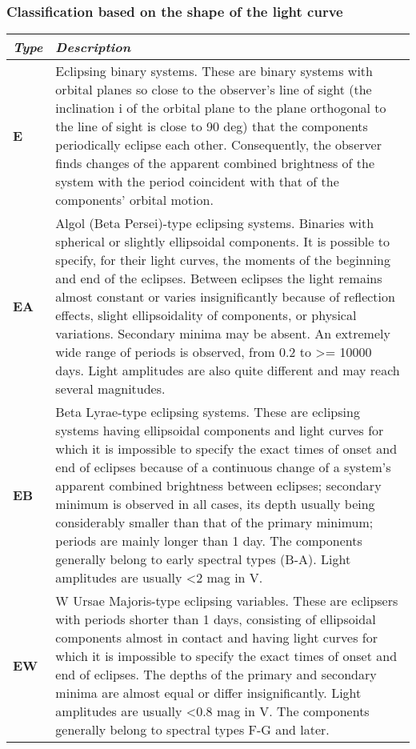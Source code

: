 \subsubsection{Classification based on the shape of the light curve}
\label{classification-based-on-the-shape-of-the-light-curve}

\begin{longtabu} to \textwidth {l|X}\toprule
\emph{Type} & \emph{Description}\\\midrule
\textbf{E}  & Eclipsing binary systems. These are binary systems with
              orbital planes so close to the observer's line of sight (the inclination
              i of the orbital plane to the plane orthogonal to the line of sight is
              close to 90 deg) that the components periodically eclipse each other.
              Consequently, the observer finds changes of the apparent combined
              brightness of the system with the period coincident with that of the
              components' orbital motion.\\\midrule
\textbf{EA} & Algol (Beta Persei)-type eclipsing systems. Binaries with
              spherical or slightly ellipsoidal components. It is possible to specify,
              for their light curves, the moments of the beginning and end of the
              eclipses. Between eclipses the light remains almost constant or varies
              insignificantly because of reflection effects, slight ellipsoidality of
              components, or physical variations. Secondary minima may be absent. An
              extremely wide range of periods is observed, from 0.2 to \textgreater{}=
              10000 days. Light amplitudes are also quite different and may reach
              several magnitudes.\\\midrule
\textbf{EB} & Beta Lyrae-type eclipsing systems. These are eclipsing
              systems having ellipsoidal components and light curves for which it is
              impossible to specify the exact times of onset and end of eclipses
              because of a continuous change of a system's apparent combined
              brightness between eclipses; secondary minimum is observed in all cases,
              its depth usually being considerably smaller than that of the primary
              minimum; periods are mainly longer than 1 day. The components generally
              belong to early spectral types (B-A). Light amplitudes are usually
              \textless{}2 mag in V.\\\midrule
\textbf{EW} & W Ursae Majoris-type eclipsing variables. These are
              eclipsers with periods shorter than 1 days, consisting of ellipsoidal
              components almost in contact and having light curves for which it is
              impossible to specify the exact times of onset and end of eclipses. The
              depths of the primary and secondary minima are almost equal or differ
              insignificantly. Light amplitudes are usually \textless{}0.8 mag in V.
              The components generally belong to spectral types F-G and
              later.\\\bottomrule
\end{longtabu}

